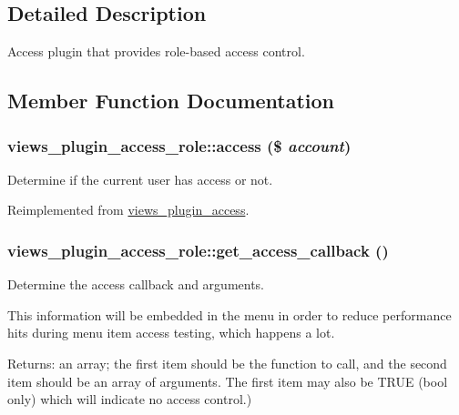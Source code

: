 \subsection{Detailed Description}
Access plugin that provides role-based access control. 

\subsection{Member Function Documentation}
\hypertarget{classviews__plugin__access__role_8de6032d940b90e06820cdbd9a15a51c}{
\subsubsection[{access}]{\setlength{\rightskip}{0pt plus 5cm}views\_\-plugin\_\-access\_\-role::access (\$ {\em account})}}
\label{classviews__plugin__access__role_8de6032d940b90e06820cdbd9a15a51c}


Determine if the current user has access or not. 

Reimplemented from \hyperlink{classviews__plugin__access_d24d38c1b1a1bd7527b2b96a2103cede}{views\_\-plugin\_\-access}.\hypertarget{classviews__plugin__access__role_50094384e297acdd629d9462004df69a}{
\subsubsection[{get\_\-access\_\-callback}]{\setlength{\rightskip}{0pt plus 5cm}views\_\-plugin\_\-access\_\-role::get\_\-access\_\-callback ()}}
\label{classviews__plugin__access__role_50094384e297acdd629d9462004df69a}


Determine the access callback and arguments.

This information will be embedded in the menu in order to reduce performance hits during menu item access testing, which happens a lot.

\begin{Desc}
\item[Returns:]an array; the first item should be the function to call, and the second item should be an array of arguments. The first item may also be TRUE (bool only) which will indicate no access control.) \end{Desc}


